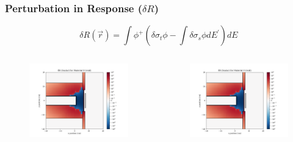 \documentclass[t]{beamer}
\begin{document}
\begin{frame}
  \frametitle{Perturbation in Response ($\delta R$)}
  \vskip-0.25in
  \begin{equation}
    \delta R\left(\vec{r}\right) = \int\phi^+\left(\delta\sigma_t\phi - \int\delta\sigma_s\phi dE^\prime\right)dE
  \end{equation}
  \vskip-0.25in
  \begin{columns}
    \begin{figure}
      \includegraphics[trim={0.7in 0.15in 1.05in 0.4in},clip,scale=0.36]{images/dR_scalar_00.png}
    \end{figure}
    \begin{figure}
      \includegraphics[trim={0.7in 0.15in 1.05in 0.4in},clip,scale=0.36]{images/dR_scalar_00.png}
    \end{figure}
  \end{columns}
\end{frame}
\end{document}
